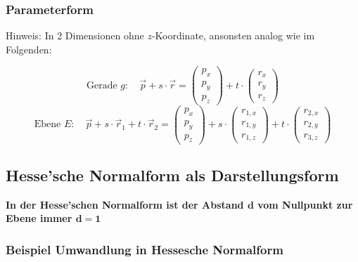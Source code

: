 \subsubsection{Parameterform}

Hinweis: In 2 Dimensionen ohne $z$-Koordinate, ansonsten analog wie im Folgenden:
		
$$ \text{Gerade } g: \quad \vec{p} + s \cdot \vec{r} = \begin{pmatrix} p_x \\ p_y \\ p_z \end{pmatrix}+ t \cdot \begin{pmatrix} r_x \\ r_y \\ r_z \end{pmatrix} $$
$$ \text{Ebene } E: \quad \vec{p} + s \cdot \vec{r}_1 + t \cdot \vec{r}_2 = \begin{pmatrix} p_x \\ p_y \\ p_z \end{pmatrix}	+ s \cdot \begin{pmatrix} r_{1,x} \\ r_{1,y} \\ r_{1,z} \end{pmatrix} + t \cdot \begin{pmatrix} r_{2,x} \\ r_{2,y} \\ r_{3,z} \end{pmatrix} $$ 
		

\subsection{Hesse'sche Normalform als Darstellungsform}
\label{Hessesche Normalform}

\textbf{In der Hesse'schen Normalform ist der Abstand $\bm{d}$ vom Nullpunkt zur Ebene immer $\bm{d = 1}$} 
\vspace{0.2cm}

\subsubsection{Beispiel Umwandlung in Hessesche Normalform}

